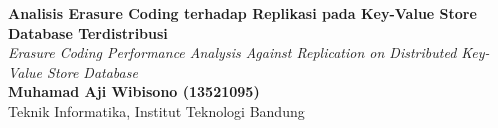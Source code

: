 \documentclass[a0,landscape]{config/poster/a0poster}
\begin{document}

\begin{minipage}[c]{0.75\linewidth}
	\veryHuge \textbf{Analisis Erasure Coding terhadap Replikasi pada Key-Value Store Database Terdistribusi} \\[1cm]
	\Huge \textit{Erasure Coding Performance Analysis Against Replication on Distributed Key-Value Store Database} \\[1.5cm]
	\LARGE \textbf{Muhamad Aji Wibisono (13521095)} \\
	\Large Teknik Informatika, Institut Teknologi Bandung \\
\end{minipage}

\vspace{1cm} %

\end{document}

